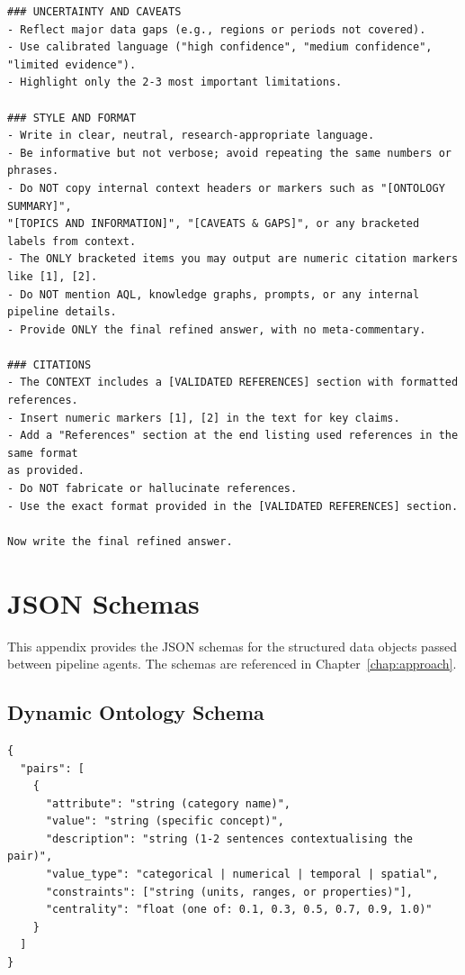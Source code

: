 \begin{lstlisting}[style=promptstyle,
caption={Generation Agent refinement prompt (full).},
label={lst:generation-prompt}]
### UNCERTAINTY AND CAVEATS
- Reflect major data gaps (e.g., regions or periods not covered).
- Use calibrated language ("high confidence", "medium confidence", "limited evidence").
- Highlight only the 2-3 most important limitations.

### STYLE AND FORMAT
- Write in clear, neutral, research-appropriate language.
- Be informative but not verbose; avoid repeating the same numbers or phrases.
- Do NOT copy internal context headers or markers such as "[ONTOLOGY SUMMARY]",
"[TOPICS AND INFORMATION]", "[CAVEATS & GAPS]", or any bracketed labels from context.
- The ONLY bracketed items you may output are numeric citation markers like [1], [2].
- Do NOT mention AQL, knowledge graphs, prompts, or any internal pipeline details.
- Provide ONLY the final refined answer, with no meta-commentary.

### CITATIONS
- The CONTEXT includes a [VALIDATED REFERENCES] section with formatted references.
- Insert numeric markers [1], [2] in the text for key claims.
- Add a "References" section at the end listing used references in the same format
as provided.
- Do NOT fabricate or hallucinate references.
- Use the exact format provided in the [VALIDATED REFERENCES] section.

Now write the final refined answer.
\end{lstlisting}

\chapter{JSON Schemas}\label{app:schemas}

This appendix provides the JSON schemas for the structured data objects
passed between pipeline agents. The schemas are referenced in
Chapter~\ref{chap:approach}.

\section{Dynamic Ontology Schema}\label{app:schema-ontology}

\begin{lstlisting}[style=promptstyle,
caption={JSON schema for the \texttt{DynamicOntology} object produced
by the Ontology Agent.},
label={lst:schema-ontology}]
{
  "pairs": [
    {
      "attribute": "string (category name)",
      "value": "string (specific concept)",
      "description": "string (1-2 sentences contextualising the pair)",
      "value_type": "categorical | numerical | temporal | spatial",
      "constraints": ["string (units, ranges, or properties)"],
      "centrality": "float (one of: 0.1, 0.3, 0.5, 0.7, 0.9, 1.0)"
    }
  ]
}
\end{lstlisting}

